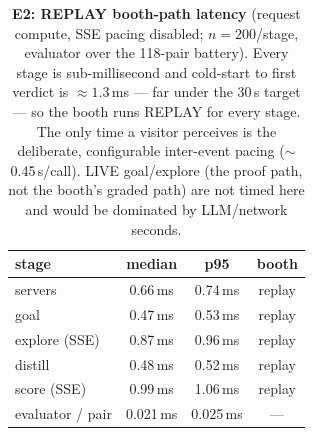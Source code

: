 \begin{table}[t]
  \centering \small
  \begin{tabular}{lccc}
    \toprule
    \textbf{stage} & \textbf{median} & \textbf{p95} & \textbf{booth} \\
    \midrule
    servers        & 0.66\,ms & 0.74\,ms & replay \\
    goal           & 0.47\,ms & 0.53\,ms & replay \\
    explore (SSE)  & 0.87\,ms & 0.96\,ms & replay \\
    distill        & 0.48\,ms & 0.52\,ms & replay \\
    score (SSE)    & 0.99\,ms & 1.06\,ms & replay \\
    \midrule
    evaluator / pair & 0.021\,ms & 0.025\,ms & --- \\
    \bottomrule
  \end{tabular}
  \caption{\textbf{E2: REPLAY booth-path latency} (request compute, SSE pacing
    disabled; $n{=}200$/stage, evaluator over the 118-pair battery). Every
    stage is sub-millisecond and cold-start to first verdict is
    ${\approx}1.3$\,ms --- far under the 30\,s target --- so the booth runs
    REPLAY for every stage. The only time a visitor perceives is the
    deliberate, configurable inter-event pacing ($\sim$0.45\,s/call). LIVE
    goal/explore (the proof path, not the booth's graded path) are not timed
    here and would be dominated by LLM/network seconds.}
  \label{tab:latency}
\end{table}
